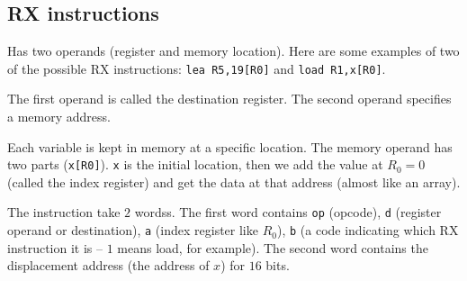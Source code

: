 \subsection{RX instructions}\label{sub:rx_instructions}

Has two operands (register and memory location).
Here are some examples of two of the possible RX instructions:
\texttt{lea R5,19[R0]} and \texttt{load R1,x[R0]}.

The first operand is called the destination register.
The second operand specifies a memory address.

Each variable is kept in memory at a specific location.
The memory operand has two parts (\texttt{x[R0]}).
\texttt{x} is the initial location, then we add the value at \(R_0 = 0\) (called the index register) and get the data at that address (almost like an array).

The instruction take \(2\) wordss.
The first word contains \texttt{op} (opcode), \texttt{d} (register operand or destination), \texttt{a} (index register like \(R_0\)), \texttt{b} (a code indicating which RX instruction it is -- \(1\) means load, for example).
The second word contains the displacement address (the address of \(x\)) for \(16\) bits.
